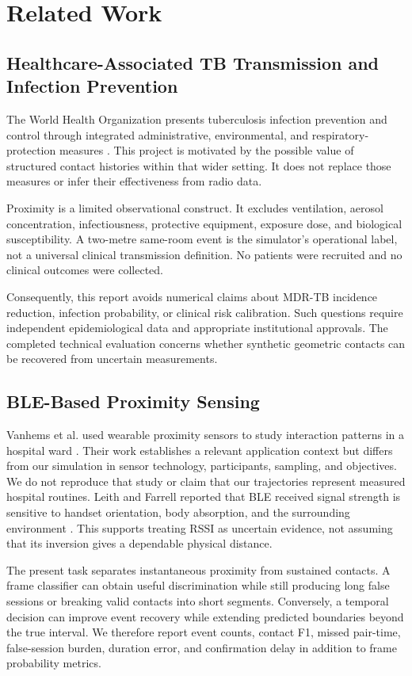 \documentclass[12pt,a4paper]{report}
\begin{document}
\chapter{Related Work}

\section{Healthcare-Associated TB Transmission and Infection Prevention}
The World Health Organization presents tuberculosis infection prevention and control through integrated administrative, environmental, and respiratory-protection measures \cite{ref17}. This project is motivated by the possible value of structured contact histories within that wider setting. It does not replace those measures or infer their effectiveness from radio data.

Proximity is a limited observational construct. It excludes ventilation, aerosol concentration, infectiousness, protective equipment, exposure dose, and biological susceptibility. A two-metre same-room event is the simulator's operational label, not a universal clinical transmission definition. No patients were recruited and no clinical outcomes were collected.

Consequently, this report avoids numerical claims about MDR-TB incidence reduction, infection probability, or clinical risk calibration. Such questions require independent epidemiological data and appropriate institutional approvals. The completed technical evaluation concerns whether synthetic geometric contacts can be recovered from uncertain measurements.

\section{BLE-Based Proximity Sensing}
Vanhems et al. used wearable proximity sensors to study interaction patterns in a hospital ward \cite{ref1}. Their work establishes a relevant application context but differs from our simulation in sensor technology, participants, sampling, and objectives. We do not reproduce that study or claim that our trajectories represent measured hospital routines. Leith and Farrell reported that BLE received signal strength is sensitive to handset orientation, body absorption, and the surrounding environment \cite{ref2}. This supports treating RSSI as uncertain evidence, not assuming that its inversion gives a dependable physical distance.

The present task separates instantaneous proximity from sustained contacts. A frame classifier can obtain useful discrimination while still producing long false sessions or breaking valid contacts into short segments. Conversely, a temporal decision can improve event recovery while extending predicted boundaries beyond the true interval. We therefore report event counts, contact F1, missed pair-time, false-session burden, duration error, and confirmation delay in addition to frame probability metrics.
\end{document}
